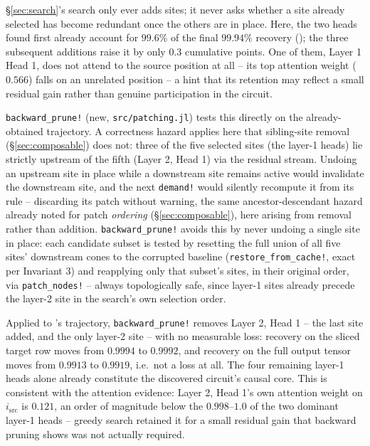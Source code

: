\documentclass{article}
\begin{document}
\S\ref{sec:search}'s search only ever adds sites; it never asks whether a site already selected
has become redundant once the others are in place. Here, the two heads found first already account
for $99.6\%$ of the final $99.94\%$ recovery (); the three subsequent
additions raise it by only $0.3$ cumulative points. One of them, Layer 1 Head 1, does not attend to
the source position at all -- its top attention weight ($0.566$) falls on an unrelated position --
a hint that its retention may reflect a small residual gain rather than genuine participation in
the circuit.

\texttt{backward\_prune!} (new, \texttt{src/patching.jl}) tests this directly on the
already-obtained trajectory. A correctness hazard applies here that sibling-site removal
(\S\ref{sec:composable}) does not: three of the five selected sites (the layer-1 heads) lie
strictly upstream of the fifth (Layer 2, Head 1) via the residual stream. Undoing an upstream site
in place while a downstream site remains active would invalidate the downstream site, and the next
\texttt{demand!} would silently recompute it from its rule -- discarding its patch without warning,
the same ancestor-descendant hazard already noted for patch \emph{ordering}
(\S\ref{sec:composable}), here arising from removal rather than addition. \texttt{backward\_prune!}
avoids this by never undoing a single site in place: each candidate subset is tested by resetting
the full union of all five sites' downstream cones to the corrupted baseline
(\texttt{restore\_from\_cache!}, exact per Invariant 3) and reapplying only that subset's sites, in
their original order, via \texttt{patch\_nodes!} -- always topologically safe, since layer-1 sites
already precede the layer-2 site in the search's own selection order.

Applied to 's trajectory, \texttt{backward\_prune!} removes Layer 2,
Head 1 -- the last site added, and the only layer-2 site -- with no measurable loss: recovery on
the sliced target row moves from $0.9994$ to $0.9992$, and recovery on the full output tensor
moves from $0.9913$ to $0.9919$, i.e.\ not a loss at all. The four remaining layer-1 heads alone
already constitute the discovered circuit's causal core. This is consistent with the attention
evidence: Layer 2, Head 1's own attention weight on $i_{\text{src}}$ is $0.121$, an order of
magnitude below the $0.998$--$1.0$ of the two dominant layer-1 heads -- greedy search retained it
for a small residual gain that backward pruning shows was not actually required.
\end{document}
